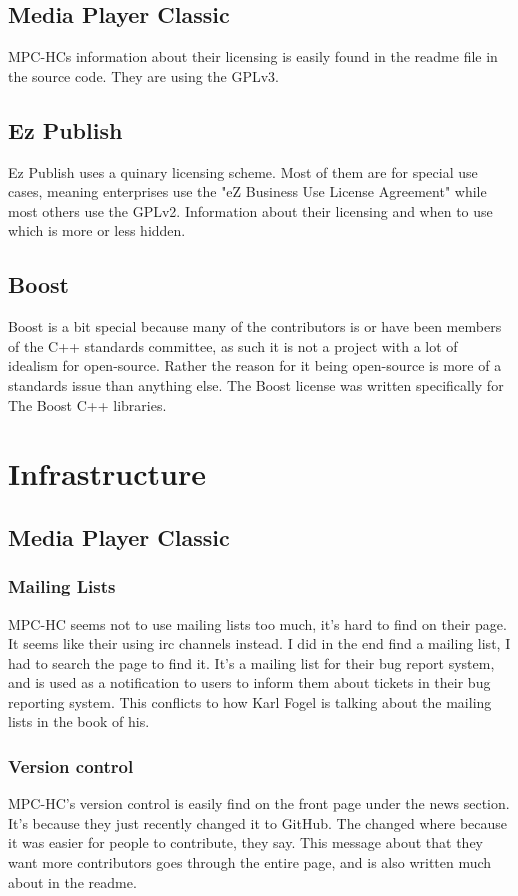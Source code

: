 \documentclass{report} %
\begin{document}
\subsection{Media Player Classic}
MPC-HCs information about their licensing is easily found in the readme file in the source code\cite{mpcsource}. They are using the GPLv3\cite{gplv3}.
\subsection{Ez Publish}
Ez Publish uses a quinary licensing scheme\cite{ezpubweblicenses}. Most of them are for special use cases, meaning enterprises use the "eZ Business Use License Agreement" while most others use the GPLv2\cite{gplv2}. Information about their licensing and when to use which is more or less hidden.
\subsection{Boost}
Boost is a bit special because many of the contributors is or have been members of the C++ standards committee, as such it is not a project with a lot of idealism for open-source. Rather the reason for it being open-source is more of a standards issue than anything else. The Boost license\cite{boostlicense} was written specifically for The Boost C++ libraries.

\section{Infrastructure}
\subsection{Media Player Classic}
\subsubsection{Mailing Lists}
MPC-HC seems not to use mailing lists too much, it's hard to find on their page. It seems like their using irc channels instead. I did in the end find a mailing list, I had to search the page to find it. It's a mailing list for their bug report system, and is used as a notification to users to inform them about tickets in their bug reporting system\cite{mpctracsupport}\cite{mpctracmail}. This conflicts to how Karl Fogel is talking about the mailing lists in the book\cite{kfposs} of his. %
\subsubsection{Version control}
MPC-HC's version control is easily find on the front page\cite{mpcweb} under the news section. It's because they just recently changed it to GitHub. The changed where because it was easier for people to contribute, they say. This message about that they want more contributors goes through the entire page, and is also written much about in the readme\cite{mpcsource}.
\end{document}
